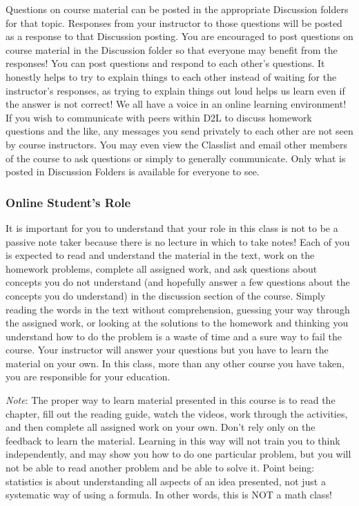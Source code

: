 \documentclass[
]{article}
\begin{document}
Questions on course material can be posted in the appropriate Discussion
folders for that topic. Responses from your instructor to those
questions will be posted as a response to that Discussion posting. You
are encouraged to post questions on course material in the Discussion
folder so that everyone may benefit from the responses! You can post
questions and respond to each other's questions. It honestly helps to
try to explain things to each other instead of waiting for the
instructor's responses, as trying to explain things out loud helps us
learn even if the answer is not correct! We all have a voice in an
online learning environment! If you wish to communicate with peers
within D2L to discuss homework questions and the like, any messages you
send privately to each other are not seen by course instructors. You may
even view the Classlist and email other members of the course to ask
questions or simply to generally communicate. Only what is posted in
Discussion Folders is available for everyone to see.

\subsubsection{Online Student's Role}\label{online-students-role}

It is important for you to understand that your role in this class is
not to be a passive note taker because there is no lecture in which to
take notes! Each of you is expected to read and understand the material
in the text, work on the homework problems, complete all assigned work,
and ask questions about concepts you do not understand (and hopefully
answer a few questions about the concepts you do understand) in the
discussion section of the course. Simply reading the words in the text
without comprehension, guessing your way through the assigned work, or
looking at the solutions to the homework and thinking you understand how
to do the problem is a waste of time and a sure way to fail the course.
Your instructor will answer your questions but you have to learn the
material on your own. In this class, more than any other course you have
taken, you are responsible for your education.

\emph{Note}: The proper way to learn material presented in this course
is to read the chapter, fill out the reading guide, watch the videos,
work through the activities, and then complete all assigned work on your
own. Don't rely only on the feedback to learn the material. Learning in
this way will not train you to think independently, and may show you how
to do one particular problem, but you will not be able to read another
problem and be able to solve it. Point being: statistics is about
understanding all aspects of an idea presented, not just a systematic
way of using a formula. In other words, this is NOT a math class!
\end{document}
